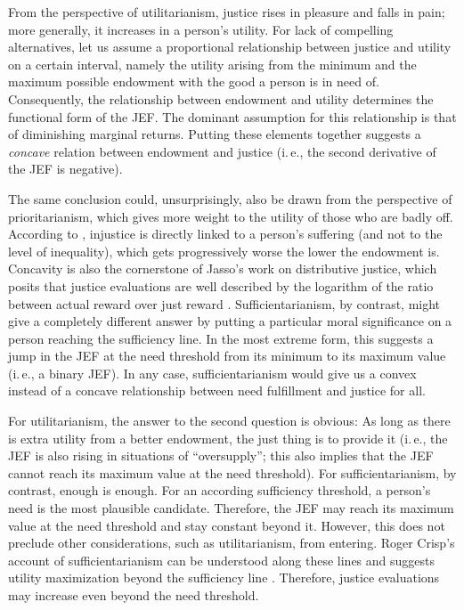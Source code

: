 \documentclass[12pt]{scrartcl}
\begin{document}
From the perspective of utilitarianism, justice rises in pleasure and falls in pain; more generally, it increases in a person's utility.
For lack of compelling alternatives, let us assume a proportional relationship between justice and utility on a certain interval, namely the utility arising from the minimum and the maximum possible endowment with the good a person is in need of.
Consequently, the relationship between endowment and utility determines the functional form of the JEF.
The dominant assumption for this relationship is that of diminishing marginal returns.
Putting these elements together suggests a \textit{concave} relation between endowment and justice (i.\,e., the second derivative of the JEF is negative).

The same conclusion could, unsurprisingly, also be drawn from the perspective of prioritarianism, which gives more weight to the utility of those who are badly off.
According to \citet{arneson_egalitarianism_2002}, injustice is directly linked to a person's suffering (and not to the level of inequality), which gets progressively worse the lower the endowment is.
Concavity is also the cornerstone of Jasso's work on distributive justice, which posits that justice evaluations are well described by the logarithm of the ratio between actual reward over just reward \citep[e.\,g.,][]{jasso_justice_1978,jasso_methods_1990}.
Sufficientarianism, by contrast, might give a completely different answer by putting a particular moral significance on a person reaching the sufficiency line.
In the most extreme form, this suggests a jump in the JEF at the need threshold from its minimum to its maximum value (i.\,e., a binary JEF).
In any case, sufficientarianism would give us a convex instead of a concave relationship between need fulfillment and justice for all.

For utilitarianism, the answer to the second question is obvious: As long as there is extra utility from a better endowment, the just thing is to provide it (i.\,e., the JEF is also rising in situations of ``oversupply''; this also implies that the JEF cannot reach its maximum value at the need threshold).
For sufficientarianism, by contrast, enough is enough.
For an according sufficiency threshold, a person's need is the most plausible candidate.
Therefore, the JEF may reach its maximum value at the need threshold and stay constant beyond it.
However, this does not preclude other considerations, such as utilitarianism, from entering.
Roger Crisp's \citeyearpar{crisp_egalitarianism_2003} account of sufficientarianism can be understood along these lines and suggests utility maximization beyond the sufficiency line \citep[see][]{arneson_egalitarianism_2002}.
Therefore, justice evaluations may increase even beyond the need threshold.
\end{document}
